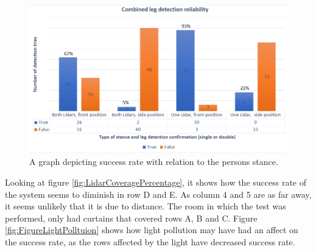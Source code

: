 \begin{figure}[H]
    \centering
    \includegraphics[width=\textwidth]{figures/CombinedLegDetection2.png}
    \caption{A graph depicting success rate with relation to the persons stance.}
    \label{fig:CombinedLegDetection2}
\end{figure}

Looking at figure \ref{fig:LidarCoveragePercentage}, it shows how the success rate of the system seems to diminish in row D and E. As column 4 and 5 are as far away, it seems unlikely that it is due to distance. The room in which the test was performed, only had curtains that covered rows A, B and C. Figure \ref{fig:FigureLightPolltuion} shows how light pollution may have had an affect on the success rate, as the rows affected by the light have decreased success rate.

